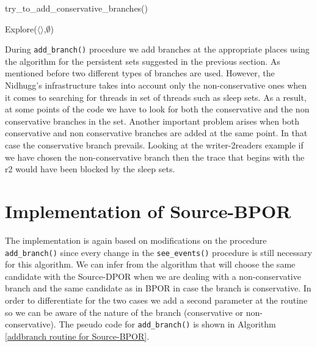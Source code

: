 \begin{algorithm}[H]
    \caption{try\_to\_add\_conservative\_branches()}
    \label{try to add conservative branch}
    Explore($\langle \rangle$,$\emptyset$)\;
\end{algorithm}

During \verb|add_branch()| procedure we add branches at the appropriate places using the algorithm for the persistent
sets suggested in the previous section. As mentioned before two different types of branches are used. However, the
Nidhugg's infrastructure takes into account only the non-conservative ones when it comes to searching for threads in set
of threads such as sleep sets. As a result, at some points of the code we have to look for both the conservative and the
non conservative branches in the set. Another important problem arises when both conservative and non conservative
branches are added at the same point. In that case the conservative branch prevails. Looking at the writer-2readers
example if we have chosen the non-conservative branch then the trace that begins with the r2 would have been blocked by
the sleep sets.

\section{Implementation of Source-BPOR}

The implementation is again based on modifications on the procedure \verb|add_branch()| since every change in the
\verb|see_events()| procedure is still necessary for this algorithm. We can infer from the algorithm that will choose
the same candidate with the Source-DPOR when we are dealing with a non-conservative branch and the same candidate as in
BPOR in case the branch is conservative. In order to differentiate for the two cases we add a second parameter at the
routine so we can be aware of the nature of the branch (conservative or non-conservative). The pseudo code for
\verb|add_branch()| is shown in Algorithm \ref{addbranch routine for Source-BPOR}.

